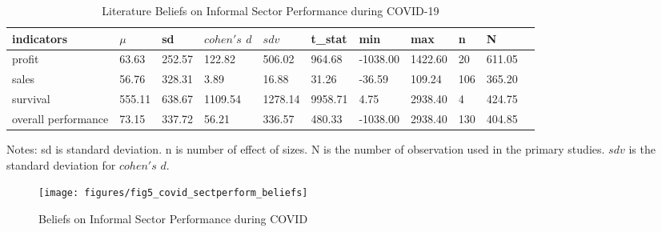 \documentclass[12pt, english]{article}
\begin{document}
    \begin{table}[H]
        \centering
        \caption{Literature Beliefs on Informal Sector Performance during COVID-19}
        \label{tab3:literature-beliefs-informal-covid}
        \begin{tabular}{lllllllllll}
            \toprule
            indicators          & $\mu$  & sd     & $cohen's$ $d$ & $sdv$   & t\_stat & min      & max     & n   & N      \\
            \midrule
            profit              & 63.63  & 252.57 & 122.82        & 506.02  & 964.68  & -1038.00 & 1422.60 & 20  & 611.05 \\
            sales               & 56.76  & 328.31 & 3.89          & 16.88   & 31.26   & -36.59   & 109.24  & 106 & 365.20 \\
            survival            & 555.11 & 638.67 & 1109.54       & 1278.14 & 9958.71 & 4.75     & 2938.40 & 4   & 424.75 \\
            overall performance & 73.15  & 337.72 & 56.21         & 336.57  & 480.33  & -1038.00 & 2938.40 & 130 & 404.85 \\
            \bottomrule
        \end{tabular}
        \begin{minipage}{17cm}
            \vspace{0.1cm}
            \small Notes: sd is standard deviation. n is number of effect of sizes. N is the number of observation used in the primary studies. $sdv$ is the standard deviation for $cohen's$ $d$.
        \end{minipage}
    \end{table}

    \begin{figure}[H]
        \centering
        \texttt{[image: figures/fig5\_covid\_sectperform\_beliefs]}
        \caption{Beliefs on Informal Sector Performance during COVID}
        \label{fig4:beliefs-inf-sector-perform-covid}
    \end{figure}
\end{document}
